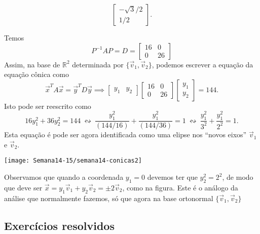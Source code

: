 \begin{ex}
\begin{itemize}
\begin{equation}
		\begin{bmatrix}
		-\sqrt{3}/2 \\ 1/2
		\end{bmatrix}.
		\end{equation}
	\end{itemize} Temos
	\begin{equation}
	P^{-1} A P = D =
	\begin{bmatrix}
	16 & 0 \\ 0 & 26
	\end{bmatrix}
	\end{equation} Assim, na base de $\mathbb{R}^2$ determinada por $\{\vec{v}_1, \vec{v}_2\}$, podemos escrever a equação da equação cônica como
	\begin{equation}
	\vec{x}^T A \vec{x} = \vec{y}^T D \vec{y} \implies
	\begin{bmatrix}
	y_1 & y_2
	\end{bmatrix}
	\begin{bmatrix}
	16 & 0 \\ 0 & 26
	\end{bmatrix}
	\begin{bmatrix}
	y_1 \\ y_2
	\end{bmatrix} = 144.
	\end{equation} Isto pode ser reescrito como
	\begin{equation}
	16 y_1^2 + 36 y_2^2 = 144 \ \leftrightsquigarrow \ \frac{y_1^2}{(144/16)} + \frac{y_1^2}{(144/36)} = 1 \ \leftrightsquigarrow \ \frac{y_1^2}{3^2} + \frac{y_1^2}{2^2} = 1.
	\end{equation} Esta equação é pode ser agora identificada como uma elipse nos ``novos eixos'' $\vec{v}_1$ e $\vec{v}_2$.
	\begin{center}
		\texttt{[image: Semana14-15/semana14-conicas2]}
	\end{center}

	\noindent Observamos que quando a coordenada $y_1 = 0$ devemos ter que $y_2^2 = 2^2$, de modo que deve ser $\vec{x} = y_1 \vec{v}_1 + y_2 \vec{v}_2 = \pm 2 \vec{v}_2$, como na figura. Este é o análogo da análise que normalmente fazemos, só que agora na base ortonormal $\{\vec{v}_1, \vec{v}_2\}$
\end{ex}

\subsection*{Exercícios resolvidos}

